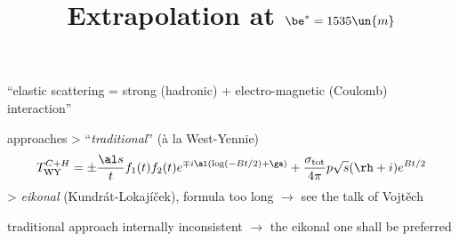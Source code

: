 \> ``elastic scattering = strong (hadronic) + electro-magnetic (Coulomb) interaction''

 approaches
\>> ``{\it\fgt traditional\fg}'' (\`a la West-Yennie)
\vskip-1mm
$$T^{C+H}_{\rm WY} = \pm {\al s \over t} f_1(t) f_2(t) e^{\mp i\al (\log(-Bt/2) + \ga )} + {\sigma_{\rm tot} \over {4\pi}} p\sqrt{s} (\rh+i)e^{Bt/2}$$
\vskip2mm
\>> {\fgt\it eikonal\fg} (Kundrát-Lokajíček), formula too long $\rightarrow$ see the talk of Vojtěch

\> traditional approach internally inconsistent $\rightarrow$ the eikonal one shall be preferred 

\centerline{\hss{}}

\newpage %
\title{Extrapolation at $\be^* = 1535\un{m}$}



\newpage %

